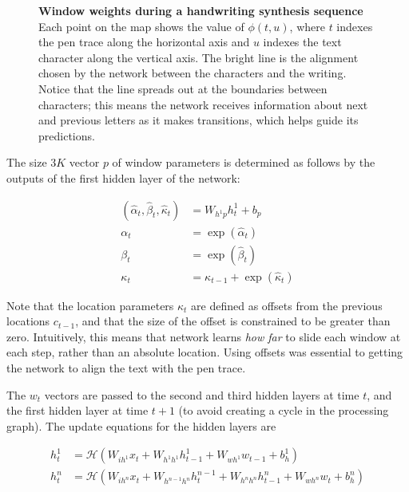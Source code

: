 \begin{figure}
\begin{center}

\end{center}
\caption[Window weights during a handwriting synthesis sequence]{\textbf{Window weights during a handwriting synthesis sequence} Each point on the map shows the value of $\phi(t, u)$, where $t$ indexes the pen trace along the horizontal axis and $u$ indexes the text character along the vertical axis. The bright line is the alignment chosen by the network between the characters and the writing. Notice that the line spreads out at the boundaries between characters; this means the network receives information about next and previous letters as it makes transitions, which helps guide its predictions.}
\label{fig:window_weights}
\end{figure}

The size $3K$ vector $p$ of window parameters is determined as follows by the outputs of the first hidden layer of the network:

\begin{align}
(\hat{\alpha}_t, \hat{\beta}_t, \hat{\kappa}_t) &= W_{h^1 p} h^1_t + b_p\\
{\alpha}_t &= \exp\left(\hat{\alpha}_t\right)\\
{\beta}_t &= \exp\left(\hat{\beta}_t\right)\\
{\kappa}_t &= \kappa_{t-1} + \exp\left(\hat{\kappa}_t\right)
\end{align}

Note that the location parameters ${\kappa}_t$ are defined as offsets from the previous locations $c_{t-1}$, and that the size of the offset is constrained to be greater than zero. Intuitively, this means that network learns \emph{how far} to slide each window at each step, rather than an absolute location. Using offsets was essential to getting the network to align the text with the pen trace.

The $w_t$ vectors are passed to the second and third hidden layers at time $t$, and the first hidden layer at time $t+1$ (to avoid creating a cycle in the processing graph). The update equations for the hidden layers are

\begin{align}
\label{eq:synth_hidden}
h^1_t &= \mathcal{H}\left(W_{i h^1} x_t + W_{h^{1}h^{1}} h^1_{t-1} + W_{w h^{1}} w_{t-1} + b_{h}^1 \right)\\
h^n_t &= \mathcal{H}\left(W_{i h^n} x_t + W_{h^{n-1}h^{n}} h^{n-1}_t + W_{h^{n}h^{n}} h^n_{t-1} + W_{w h^{n}} w_{t} + b_{h}^n \right)
\end{align}

